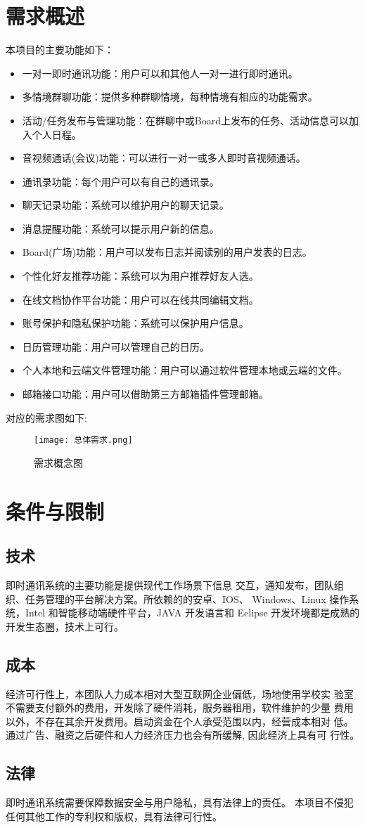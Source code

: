 \section{需求概述}
本项目的主要功能如下：
\begin{itemize}
	\item 一对一即时通讯功能：用户可以和其他人一对一进行即时通讯。
	\item 多情境群聊功能：提供多种群聊情境，每种情境有相应的功能需求。
	\item 活动/任务发布与管理功能：在群聊中或Board上发布的任务、活动信息可以加入个人日程。
	\item 音视频通话(会议)功能：可以进行一对一或多人即时音视频通话。
	\item 通讯录功能：每个用户可以有自己的通讯录。
	\item 聊天记录功能：系统可以维护用户的聊天记录。
	\item 消息提醒功能：系统可以提示用户新的信息。
	\item Board(广场)功能：用户可以发布日志并阅读别的用户发表的日志。
	\item 个性化好友推荐功能：系统可以为用户推荐好友人选。
	\item 在线文档协作平台功能：用户可以在线共同编辑文档。
	\item 账号保护和隐私保护功能：系统可以保护用户信息。
	\item 日历管理功能：用户可以管理自己的日历。
	\item 个人本地和云端文件管理功能：用户可以通过软件管理本地或云端的文件。
	\item 邮箱接口功能：用户可以借助第三方邮箱插件管理邮箱。
\end{itemize}

对应的需求图如下:
\newpage
\begin{figure}[ht]
            \centering
            \texttt{[image: 总体需求.png]}\label{tab:classification}
            \caption{需求概念图}\label{fig:noted-figure}
        \end{figure}

\section{条件与限制}
\subsection{技术}
即时通讯系统的主要功能是提供现代工作场景下信息
交互，通知发布，团队组织、任务管理的平台解决方案。所依赖的的安卓、IOS、
Windows、Linux 操作系统，Intel 和智能移动端硬件平台，JAVA 开发语言和 Eclipse
开发环境都是成熟的开发生态圈，技术上可行。
\subsection{成本}
经济可行性上，本团队人力成本相对大型互联网企业偏低，场地使用学校实
验室不需要支付额外的费用，开发除了硬件消耗，服务器租用，软件维护的少量
费用以外，不存在其余开发费用。启动资金在个人承受范围以内，经营成本相对
低。通过广告、融资之后硬件和人力经济压力也会有所缓解, 因此经济上具有可
行性。
\subsection{法律}
即时通讯系统需要保障数据安全与用户隐私，具有法律上的责任。
本项目不侵犯任何其他工作的专利权和版权，具有法律可行性。
